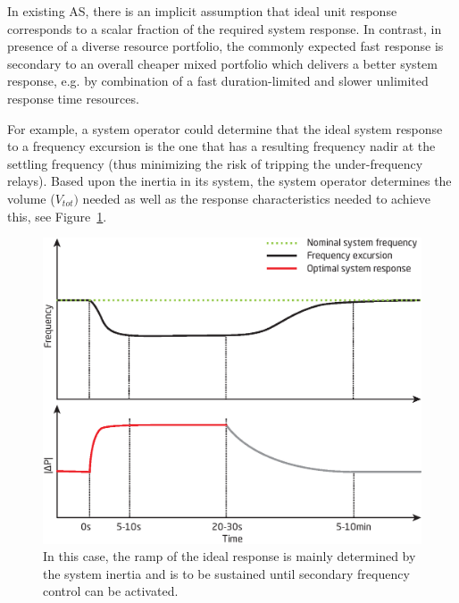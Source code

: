 In existing AS, there is an implicit assumption that ideal unit response corresponds to a scalar fraction of the required system response. In contrast, in presence of a diverse resource portfolio, the commonly expected fast response is secondary to an overall cheaper mixed portfolio which delivers a better system response, e.g. by combination of a fast duration-limited and slower unlimited response time resources.


For example, a system operator could determine that the ideal system response to a frequency excursion is the one that has a resulting frequency nadir at the settling frequency (thus minimizing the risk of tripping the under-frequency relays). Based upon the inertia in its system, the system operator determines the volume ($V_{tot})$ needed as well as the response characteristics needed to achieve this, see Figure~\ref{fig:ddrasidealresponse}.

\begin{figure}[htbp!]
\centering
\includegraphics[width=1\columnwidth]{graphics/ddras/primary_frequency_control_ideal.eps}
\caption{In this case, the ramp of the ideal response is mainly determined by the system inertia and is to be sustained until secondary frequency control can be activated.}
\label{fig:ddrasidealresponse}
\end{figure}

